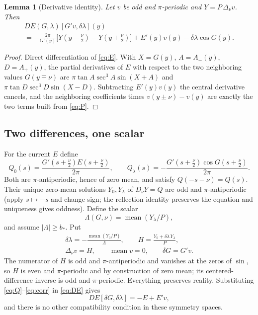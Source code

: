 \documentclass[11pt]{amsart}
\numberwithin{equation}{section}
\newtheorem{lemma}[theorem]{Lemma}
\theoremstyle{definition}
\theoremstyle{remark}
\newcommand{\abs}[1]{\lvert #1\rvert}
\newcommand{\mean}{\operatorname{mean}}
\begin{document}
\begin{lemma}[Derivative identity]\label{lem:DE}
Let $v$ be odd and $\pi$-periodic and $Y=P\,\Delta_\nu v$. Then
\begin{multline}\label{eq:DE}
DE(G,\lambda)[G'v,\delta\lambda](y)\\
=-\frac{2\pi}{G'(y)}\bigl[Y(y-\tfrac\nu2)-Y(y+\tfrac\nu2)\bigr]+E'(y)v(y)-\delta\lambda\cos G(y).
\end{multline}
\end{lemma}

\begin{proof}
Direct differentiation of \eqref{eq:E}. With $X=G(y)$, $A=A_-(y)$, $D=A_+(y)$, the partial derivatives of $E$ with respect to the two neighboring values $G(y\mp\nu)$ are $\pi\tan A\sec^3A\sin(X+A)$ and $\pi\tan D\sec^3D\sin(X-D)$. Subtracting $E'(y)v(y)$ the central derivative cancels, and the neighboring coefficients times $v(y\pm\nu)-v(y)$ are exactly the two terms built from \eqref{eq:P}.
\end{proof}

\subsection{Two differences, one scalar}
For the current $E$ define
\begin{equation}\label{eq:Q}
Q_0(s)=\frac{G'(s+\frac\nu2)E(s+\frac\nu2)}{2\pi},\qquad Q_\lambda(s)=-\frac{G'(s+\frac\nu2)\cos G(s+\frac\nu2)}{2\pi}.
\end{equation}
Both are $\pi$-antiperiodic, hence of zero mean, and satisfy $Q(-s-\nu)=Q(s)$. Their unique zero-mean solutions $Y_0,Y_\lambda$ of $D_\nu Y=Q$ are odd and $\pi$-antiperiodic (apply $s\mapsto-s$ and change sign; the reflection identity preserves the equation and uniqueness gives oddness). Define the scalar
\begin{equation}\label{eq:Lambda}
\Lambda(G,\nu)=\mean(Y_\lambda/P),
\end{equation}
and assume $\abs\Lambda\ge b_*$. Put
\begin{equation}\label{eq:corr}
\begin{gathered}
\delta\lambda=-\frac{\mean(Y_0/P)}{\Lambda},\qquad H=\frac{Y_0+\delta\lambda\,Y_\lambda}{P},\\
\Delta_\nu v=H,\qquad\mean v=0,\qquad\delta G=G'v.
\end{gathered}
\end{equation}
The numerator of $H$ is odd and $\pi$-antiperiodic and vanishes at the zeros of $\sin$, so $H$ is even and $\pi$-periodic and by construction of zero mean; its centered-difference inverse is odd and $\pi$-periodic. Everything preserves reality. Substituting \eqref{eq:Q}--\eqref{eq:corr} in \eqref{eq:DE} gives
\begin{equation}\label{eq:newtoneq}
DE[\delta G,\delta\lambda]=-E+E'v,
\end{equation}
and there is no other compatibility condition in these symmetry spaces.
\end{document}
